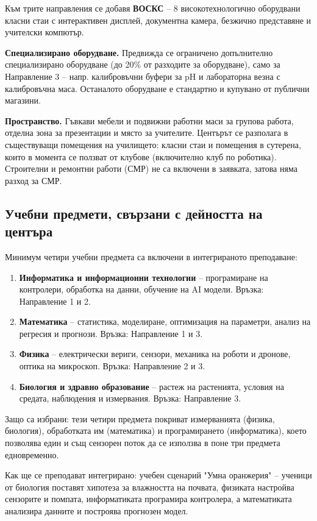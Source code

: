 \documentclass[11pt,a4paper]{article}
\begin{document}
Към трите направления се добавя \textbf{ВОСКС} – 8 високотехнологично оборудвани класни стаи с интерактивен дисплей, документна камера, безжично представяне и учителски компютър.

\textbf{Специализирано оборудване.} Предвижда се ограничено допълнително специализирано оборудване (до 20\% от разходите за оборудване), само за Направление 3 – напр. калибровъчни буфери за pH и лабораторна везна с калибровъчна маса. Останалото оборудване е стандартно и купувано от публични магазини.

\textbf{Пространство.} Гъвкави мебели и подвижни работни маси за групова работа, отделна зона за презентации и място за учителите. Центърът се разполага в съществуващи помещения на училището: класни стаи и помещения в сутерена, които в момента се ползват от клубове (включително клуб по роботика). Строителни и ремонтни работи (СМР) не са включени в заявката, затова няма разход за СМР.

\subsection{Учебни предмети, свързани с дейността на центъра}

Минимум четири учебни предмета са включени в интегрираното преподаване:
\begin{enumerate}
  \item \textbf{Информатика и информационни технологии} – програмиране на контролери, обработка на данни, обучение на AI модели. Връзка: Направление 1 и 2.
  \item \textbf{Математика} – статистика, моделиране, оптимизация на параметри, анализ на регресия и прогнози. Връзка: Направление 1 и 3.
  \item \textbf{Физика} – електрически вериги, сензори, механика на роботи и дронове, оптика на микроскоп. Връзка: Направление 2 и 3.
  \item \textbf{Биология и здравно образование} – растеж на растенията, условия на средата, наблюдения и измервания. Връзка: Направление 3.
\end{enumerate}

Защо са избрани: тези четири предмета покриват измерванията (физика, биология), обработката им (математика) и програмирането (информатика), което позволява един и същ сензорен поток да се използва в поне три предмета едновременно.

Как ще се преподават интегрирано: учебен сценарий "Умна оранжерия" – ученици от биология поставят хипотеза за влажността на почвата, физиката настройва сензорите и помпата, информатиката програмира контролера, а математиката анализира данните и построява прогнозен модел.
\end{document}
